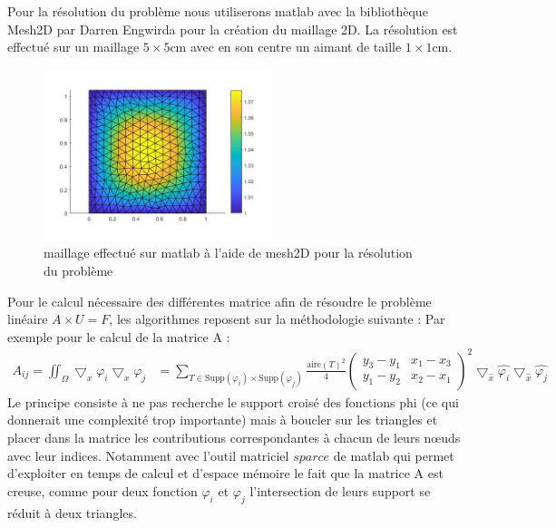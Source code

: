 \documentclass[a4paper,12pt,titlepage]{report}
\begin{document}
\begin{onehalfspace}
Pour la résolution du problème nous utiliserons matlab avec la bibliothèque Mesh2D par Darren Engwirda pour la création du maillage 2D.
La résolution est effectué sur un maillage $5\times 5$cm avec en son centre un aimant de taille $1\times 1$cm.

\begin{figure}[h]
\begin{center}
\includegraphics[height = 5cm, keepaspectratio]{graphes/sheme.jpg} 
\caption{\label{figure 3 } maillage effectué sur matlab à l'aide de mesh2D pour la résolution du problème}
\end{center}
\end{figure}
\newpage
Pour le calcul nécessaire des différentes matrice afin de résoudre le problème linéaire $A\times U = F$, les algorithmes reposent sur la méthodologie suivante :
Par exemple pour le calcul de la matrice A : 
\[
\begin{aligned}
A_{ij} = 
	\iint_{\Omega}\bigtriangledown_{x}{\varphi_{i}} \bigtriangledown_{x}{\varphi_{j}} &= 
	\sum_{T \in \text{Supp}(\varphi_{i})\times \text{Supp}(\varphi_{j})}	
	\frac{\text{aire}(T)^{2}}{4}
	\begin{pmatrix}
   		y_{3}-y_{1} &  	x_{1}-x_{3}\\
   		y_{1}-y_{2} &  x_{2}-x_{1}
	\end{pmatrix}
	^{2}
	\bigtriangledown_{\hat{x}} \hat{\varphi_{i}}
	\bigtriangledown_{\hat{x}} \hat{\varphi_{j}}
\end{aligned}
\]
Le principe consiste à ne pas recherche le support croisé des fonctions phi (ce qui donnerait une complexité trop importante) mais à boucler sur les triangles et placer dans la matrice les contributions correspondantes à chacun de leurs nœuds avec leur indices. Notamment avec l'outil matriciel $sparce$ de matlab qui permet d'exploiter en temps de calcul et d'espace mémoire le fait que la matrice A est creuse, comme pour deux fonction $\varphi_{i}$ et $\varphi_{j}$ l'intersection de leurs support se réduit à deux triangles. 
\\

\end{onehalfspace}
\end{document}
